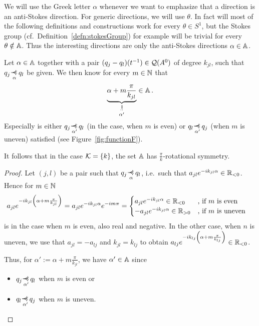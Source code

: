 We will use the Greek letter $\alpha$ whenever we want to emphasize that a
direction is an anti-Stokes direction.
For generic directions, we will use $\theta$.
In fact will most of the following definitions and
constructions work for every $\theta\in S^1$, but the Stokes group
(cf.\ Definition~\ref{defn:stokesGroup}) for example will be trivial
for every $\theta\notin\mathbb{A}$.
Thus the interesting directions are  only the anti-Stokes directions
$\alpha\in\mathbb{A}$.

\begin{lem}\label{lem:rotationalSym}%
  Let $\alpha\in\mathbb{A}$ together with a pair $(q_j-q_l)(t^{-1})\in\mathcal{Q}(A^0)$ of
  degree $k_{jl}$, such that $q_j\myrel{\alpha}q_l$ be given.
  We then know for every $m\in\mathbb{N}$ that
  \[
  \underset{\alpha'}{
    \underset{\text{\rotatebox[origin=c]{-90}{$=:$}}}{%
      \underbrace{\alpha+m\frac{\pi}{k_{jl}}}}}
  \in \A \,.
  \]
  Especially is either $q_j\myrel{\alpha'}q_l$ (in the case, when $m$ is even)
  or $q_l\myrel{\alpha'}q_j$ (when $m$ is uneven) satisfied
  (see Figure~\ref{fig:functionF}).
  \begin{s-cor}
    It follows that in the case $\mathcal{K}=\{k\}$, the set $\mathbb{A}$ has
    $\frac{\pi}{k}$-rotational symmetry.
  \end{s-cor}
\end{lem}
\begin{proof}
  Let $(j,l)$ be a pair such that $q_j\myrel{\alpha}q_l$, i.e.\ such that
  $a_{jl}e^{-ik_{jl}\alpha}\in\mathbb{R}_{<0}$.
  Hence for $m\in\mathbb{N}$
  \begin{align*}
    a_{jl}e^{-ik_{jl}\left(\alpha+m\frac{\pi}{k_{jl}}\right)}
    &=a_{jl}e^{-ik_{jl}\alpha}e^{-im\pi}
    = \begin{cases}
      a_{jl}e^{-ik_{jl}\alpha}\in\mathbb{R}_{<0}
        & \text{, if $m$ is even}
    \\-a_{jl}e^{-ik_{jl}\alpha}\in\mathbb{R}_{>0}
        & \text{, if $m$ is uneven}
    \end{cases}
  \end{align*}
  is in the case when $m$ is even, also real and negative. In the other case,
  when $n$ is uneven, we use that $a_{jl}=-a_{lj}$ and $k_{jl}=k_{lj}$ to
  obtain
  $a_{lj}e^{-ik_{lj}\left(\alpha+m\frac{\pi}{k_{lj}}\right)} \in\mathbb{R}_{<0}$.

  Thus, for $\alpha':=\alpha+m\frac{\pi}{k_{jl}}$, we have $\alpha'\in\mathbb{A}$ since
  \begin{itemize}
    \item $q_j\myrel{\alpha'}q_l$ when $m$ is even or
    \item $q_l\myrel{\alpha'}q_j$ when $m$ is uneven.
  \end{itemize}
\end{proof}


